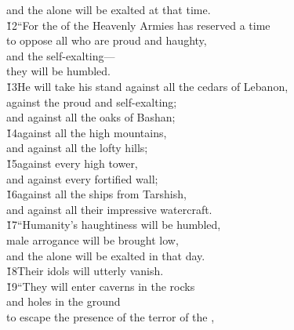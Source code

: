 \begin{poetry}
\poemlll       and the  alone will be exalted at that time. \\
\poeml \v{12}``For the  of the Heavenly Armies has reserved a time \\
\poemll    to oppose all who are proud and haughty, \\
\poeml and the self-exalting--- \\
\poemll    they will be humbled. \\
\poeml \v{13}He will take his stand against all the cedars of Lebanon, \\
\poemll    against the proud and self-exalting; \\
\poemlll       and against all the oaks of Bashan; \\
\poeml \v{14}against all the high mountains, \\
\poemll    and against all the lofty hills; \\
\poeml \v{15}against every high tower, \\
\poemll    and against every fortified wall; \\
\poeml \v{16}against all the ships from Tarshish, \\
\poemll    and against all their impressive watercraft. \\
\poeml \v{17}``Humanity's haughtiness will be humbled, \\
\poemll    male arrogance will be brought low, \\
\poeml and the  alone will be exalted in that day. \\
\poeml \v{18}Their idols will utterly vanish. \\
\poeml \v{19}``They will enter caverns in the rocks \\
\poemll    and holes in the ground \\
\poeml to escape the presence of the terror of the , \\

\end{poetry}

